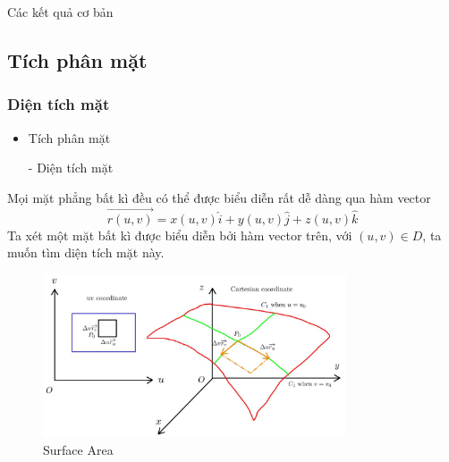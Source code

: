 \documentclass[8pt]{beamer}
\begin{document}
\begin{frame}{Các kết quả cơ bản}
\subsection{Tích phân mặt}
\subsubsection{Diện tích mặt}
\begin{itemize}
	\item Tích phân mặt
\end{itemize}
\begin{itemize}
	\item[-] Diện tích mặt
\end{itemize}
Mọi mặt phẳng bất kì đều có thể được biểu diễn rất dễ dàng qua hàm vector $$\overrightarrow{r(u,v)}=x(u,v)\hat i+y(u,v)\hat j+z(u,v)\hat k$$
Ta xét một mặt bất kì được biểu diễn bởi hàm vector trên, với $(u,v)\in D$, ta muốn tìm diện tích mặt này.
\begin{figure}[h]
			\includegraphics[width=0.8\textwidth]{cartesina.jpg}
			\caption{Surface Area}			\label{fig:re4}
\end{figure}
\end{frame}
\end{document}
